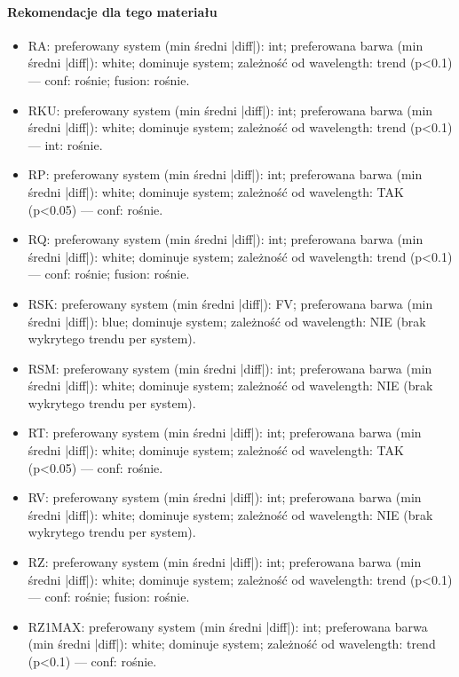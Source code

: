 \documentclass[
  10pt,
]{article}
\begin{document}
\paragraph{Rekomendacje dla tego materiału}
\begin{itemize}
\item RA: preferowany system (min średni |diff|): int; preferowana barwa (min średni |diff|): white; dominuje system; zależność od wavelength: trend (p<0.1) — conf: rośnie; fusion: rośnie.
\item RKU: preferowany system (min średni |diff|): int; preferowana barwa (min średni |diff|): white; dominuje system; zależność od wavelength: trend (p<0.1) — int: rośnie.
\item RP: preferowany system (min średni |diff|): int; preferowana barwa (min średni |diff|): white; dominuje system; zależność od wavelength: TAK (p<0.05) — conf: rośnie.
\item RQ: preferowany system (min średni |diff|): int; preferowana barwa (min średni |diff|): white; dominuje system; zależność od wavelength: trend (p<0.1) — conf: rośnie; fusion: rośnie.
\item RSK: preferowany system (min średni |diff|): FV; preferowana barwa (min średni |diff|): blue; dominuje system; zależność od wavelength: NIE (brak wykrytego trendu per system).
\item RSM: preferowany system (min średni |diff|): int; preferowana barwa (min średni |diff|): white; dominuje system; zależność od wavelength: NIE (brak wykrytego trendu per system).
\item RT: preferowany system (min średni |diff|): int; preferowana barwa (min średni |diff|): white; dominuje system; zależność od wavelength: TAK (p<0.05) — conf: rośnie.
\item RV: preferowany system (min średni |diff|): int; preferowana barwa (min średni |diff|): white; dominuje system; zależność od wavelength: NIE (brak wykrytego trendu per system).
\item RZ: preferowany system (min średni |diff|): int; preferowana barwa (min średni |diff|): white; dominuje system; zależność od wavelength: trend (p<0.1) — conf: rośnie; fusion: rośnie.
\item RZ1MAX: preferowany system (min średni |diff|): int; preferowana barwa (min średni |diff|): white; dominuje system; zależność od wavelength: trend (p<0.1) — conf: rośnie.
\end{itemize}
\end{document}

